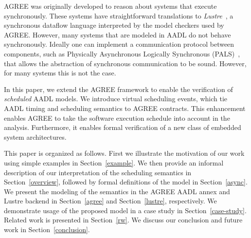 AGREE was originally developed to reason about systems that execute synchronously. These systems have straightforward translations to \emph{Lustre}~\cite{lustre}, a synchronous dataflow language interpreted by the model checkers used by AGREE. However, many systems that are modeled in AADL do not behave synchronously. Ideally one can implement a communication protocol between components, such as Physically Asynchronous Logically Synchronous (PALS)~\cite{pals}, that allows the abstraction of synchronous communication to be sound. However, for many systems this is not the case.

In this paper, we extend the AGREE framework to enable the verification of \textit{scheduled} AADL models. We introduce virtual scheduling events, which tie AADL timing and scheduling semantics to AGREE contracts. This enhancement enables AGREE to take the software execution schedule into account in the analysis. Furthermore, it enables formal verification of a new class of embedded system architectures. 

This paper is organized as follows. First we illustrate the motivation of our work using simple examples in Section~\ref{example}. We then provide an informal description of our interpretation of the scheduling semantics in Section~\ref{overview}, followed by formal definitions of the model in Section~\ref{async}. We present the modeling of the semantics in the AGREE AADL annex and Lustre backend in Section~\ref{agree} and Section~\ref{lustre}, respectively. We demonstrate usage of the proposed model in a case study in Section~\ref{case-study}. Related work is presented in Section~\ref{rw}.  We discuss our conclusion and future work in Section~\ref{conclusion}.  